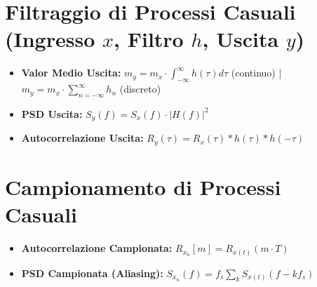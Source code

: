 \section{Filtraggio di Processi Casuali (Ingresso $x$, Filtro $h$, Uscita $y$)}
\begin{itemize}
    \item \textbf{Valor Medio Uscita:} $m_y = m_x \cdot \int_{-\infty}^{\infty} h(\tau) d\tau$ (continuo) \quad | \quad $m_y = m_x \cdot \sum_{n=-\infty}^{\infty} h_n$ (discreto)
    \item \textbf{PSD Uscita:} $S_y(f) = S_x(f) \cdot |H(f)|^2$
    \item \textbf{Autocorrelazione Uscita:} $R_y(\tau) = R_x(\tau) * h(\tau) * h(-\tau)$
\end{itemize}

\section{Campionamento di Processi Casuali}
\begin{itemize}
    \item \textbf{Autocorrelazione Campionata:} $R_{x_n}[m] = R_{x(t)}(m \cdot T)$
    \item \textbf{PSD Campionata (Aliasing):} $S_{x_n}(f) = f_s \sum_k S_{x(t)}(f - kf_s)$
\end{itemize}

